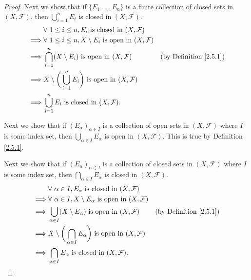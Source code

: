 \begin{proof}
    Next we show that if \(\{E_1, \dots, E_n\}\) is a finite collection of closed sets in \((X, \mathcal{F})\), then \(\bigcup_{i = 1}^n E_i\) is closed in \((X, \mathcal{F})\).
    \begin{align*}
                 & \forall\ 1 \leq i \leq n, E_i \text{ is closed in } (X, \mathcal{F})                                                    \\
        \implies & \forall\ 1 \leq i \leq n, X \setminus E_i \text{ is open in } (X, \mathcal{F})                                          \\
        \implies & \bigcap_{i = 1}^n (X \setminus E_i) \text{ is open in } (X, \mathcal{F})           & \text{(by Definition \ref{2.5.1})} \\
        \implies & X \setminus \bigg(\bigcup_{i = 1}^n E_i\bigg) \text{ is open in } (X, \mathcal{F})                                      \\
        \implies & \bigcup_{i = 1}^n E_i \text{ is closed in } (X, \mathcal{F}).
    \end{align*}

    Next we show that if \((E_\alpha)_{\alpha \in I}\) is a collection of open sets in \((X, \mathcal{F})\) where \(I\) is some index set, then \(\bigcup_{\alpha \in I} E_\alpha\) is open in \((X, \mathcal{F})\).
    This is true by Definition \ref{2.5.1}.

    Next we show that if \((E_\alpha)_{\alpha \in I}\) is a collection of closed sets in \((X, \mathcal{F})\) where \(I\) is some index set, then \(\bigcap_{\alpha \in I} E_\alpha\) is closed in \((X, \mathcal{F})\).
    \begin{align*}
                 & \forall\ \alpha \in I, E_\alpha \text{ is closed in } (X, \mathcal{F})                                                            \\
        \implies & \forall\ \alpha \in I, X \setminus E_\alpha \text{ is open in } (X, \mathcal{F})                                                  \\
        \implies & \bigcup_{\alpha \in I} (X \setminus E_\alpha) \text{ is open in } (X, \mathcal{F})           & \text{(by Definition \ref{2.5.1})} \\
        \implies & X \setminus \bigg(\bigcap_{\alpha \in I} E_\alpha\bigg) \text{ is open in } (X, \mathcal{F})                                      \\
        \implies & \bigcap_{\alpha \in I} E_\alpha \text{ is closed in } (X, \mathcal{F}).
    \end{align*}


\end{proof}
